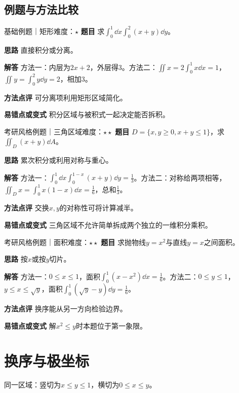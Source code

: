 \subsection{例题与方法比较}
\begin{example}{基础例题｜矩形}{难度：$\star$}
\label{ex:7:1}\textbf{题目} 求$\int_0^1\dd x\int_0^2(x+y)\dd y$。\par
\textbf{思路} 直接积分或分离。\par
\textbf{解答} 方法一：内层为$2x+2$，外层得3。方法二：$\iint x=2\int_0^1x\dd x=1$，$\iint y=\int_0^2y\dd y=2$，相加3。\par
\textbf{方法点评} 可分离项利用矩形区域简化。\par
\textbf{易错点或变式} 积分区域与被积式一起决定能否拆积。
\end{example}
\begin{example}{考研风格例题｜三角区域}{难度：$\star\star$}
\label{ex:7:2}\textbf{题目} $D=\{x,y\ge0,x+y\le1\}$，求$\iint_D(x+y)\dd A$。\par
\textbf{思路} 累次积分或利用对称与重心。\par
\textbf{解答} 方法一：$\int_0^1\dd x\int_0^{1-x}(x+y)\dd y=\frac{1}{3}$。方法二：对称给两项相等，$\iint_Dx=\int_0^1x(1-x)\dd x=\frac{1}{6}$，总和$\frac{1}{3}$。\par
\textbf{方法点评} 交换$x,y$的对称性可将计算减半。\par
\textbf{易错点或变式} 三角区域不允许简单拆成两个独立的一维积分乘积。
\end{example}
\begin{example}{考研风格例题｜面积}{难度：$\star\star$}
\label{ex:7:3}\textbf{题目} 求抛物线$y=x^2$与直线$y=x$之间面积。\par
\textbf{思路} 按$x$或按$y$切片。\par
\textbf{解答} 方法一：$0\le x\le1$，面积$\int_0^1(x-x^2)\dd x=\frac{1}{6}$。方法二：$0\le y\le1$，$y\le x\le\sqrt y$，面积$\int_0^1(\sqrt y-y)\dd y=\frac{1}{6}$。\par
\textbf{方法点评} 换序能从另一方向检验边界。\par
\textbf{易错点或变式} 解$x^2\le y$时本题位于第一象限。
\end{example}
\section{换序与极坐标}\label{sec:7:2}

\begin{center}\par\small 同一区域：竖切为$x\le y\le1$，横切为$0\le x\le y$。
\end{center}

